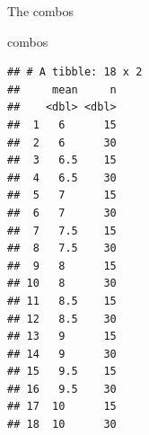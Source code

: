 \documentclass[
  ignorenonframetext,
]{beamer}
\newenvironment{Shaded}{\begin{snugshade}}{\end{snugshade}}
\newcommand{\NormalTok}[1]{#1}
\begin{document}
\begin{frame}[fragile]{The combos}
\protect\hypertarget{the-combos}{}

\begin{Shaded}
\begin{Highlighting}[]
\NormalTok{combos}
\end{Highlighting}
\end{Shaded}

\begin{verbatim}
## # A tibble: 18 x 2
##     mean     n
##    <dbl> <dbl>
##  1   6      15
##  2   6      30
##  3   6.5    15
##  4   6.5    30
##  5   7      15
##  6   7      30
##  7   7.5    15
##  8   7.5    30
##  9   8      15
## 10   8      30
## 11   8.5    15
## 12   8.5    30
## 13   9      15
## 14   9      30
## 15   9.5    15
## 16   9.5    30
## 17  10      15
## 18  10      30
\end{verbatim}

\end{frame}
\end{document}

